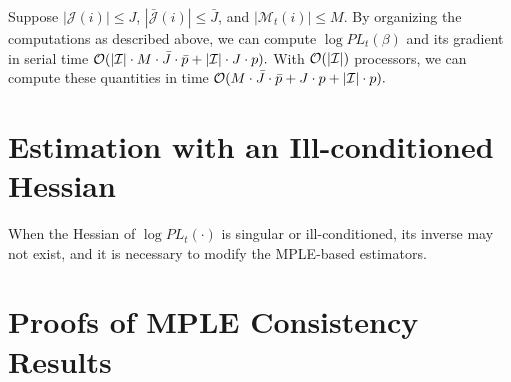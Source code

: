 \documentclass[aoas,preprint]{imsart}
\begin{document}
Suppose $|\mathcal{J}(i)| \leq J$, $|\mathcal{\bar J}(i)| \leq \bar J$,
and $|\mathcal{M}_t(i)| \leq M$.  By organizing the computations as described
above, we can compute $\log \mathit{PL}_t(\beta)$ and its gradient in serial
time
\(
    \mathcal{O}(
        | \mathcal{I} |
        \cdot
        M
        \cdot
        \bar J
        \cdot
        \bar p
        +
        |\mathcal{I}| \cdot J \cdot p
    ).
\)
With $\mathcal{O}(|\mathcal{I}|)$ processors, we can compute these quantities in time
\(
    \mathcal{O}(
        M \cdot \bar J \cdot \bar p
        +
        J \cdot p
        +
        |\mathcal{I}| \cdot p
    ).
\)

\section{Estimation with an Ill-conditioned Hessian}\label{S:regularization}

When the Hessian of $\log \mathit{PL}_t(\cdot)$ is singular or
ill-conditioned, its inverse may not exist, and it is necessary to modify
the MPLE-based estimators.

\section{Proofs of MPLE Consistency Results}\label{S:MPLE-consistency-proofs}
\end{document}
